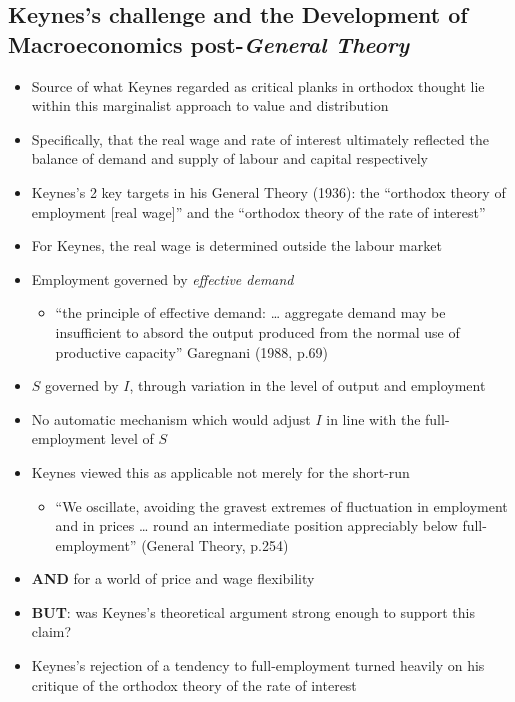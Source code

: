 \documentclass[a4paper,twoside]{article}
\numberwithin{equation}{section}
\numberwithin{figure}{section}
\begin{document}
\subsection{Keynes's challenge and the Development of Macroeconomics post-\textit{General Theory}}
		\begin{itemize}
			\item  Source of what Keynes regarded as critical planks in orthodox thought lie within this marginalist approach to value and distribution  
			\item Specifically, that the real wage and rate of interest ultimately reflected the balance of demand and supply of labour and capital respectively
			\item Keynes's 2 key targets in his General Theory (1936): the ``orthodox theory of employment [real wage]'' and the ``orthodox theory of the rate of interest'' 
			\item For Keynes, the real wage is determined outside the labour market
			\item Employment governed by \textit{effective demand }
			\begin{itemize}
				\item ``the principle of effective demand: \dots\: aggregate demand may be insufficient to absord the output produced from the normal use of productive capacity'' Garegnani (1988, p.69)
			\end{itemize}
			\item \( S \) governed by \( I \), through variation in the level of output and employment
			\item No automatic mechanism which would adjust \( I \) in line with the full-employment level of \( S \)
			\item Keynes viewed this as applicable not merely for the short-run
			\begin{itemize}
				\item ``We oscillate, avoiding the gravest extremes of fluctuation in employment and in prices … round an intermediate position appreciably below full-employment'' (General Theory, p.254)
			\end{itemize}
			\item \textbf{AND} for a world of price and wage flexibility 
			\item \textbf{BUT}: was Keynes's theoretical argument strong enough to support this claim?
			\item Keynes's rejection of a tendency to full-employment turned heavily on his critique of the orthodox theory of the rate of interest

\end{itemize}
\end{document}
